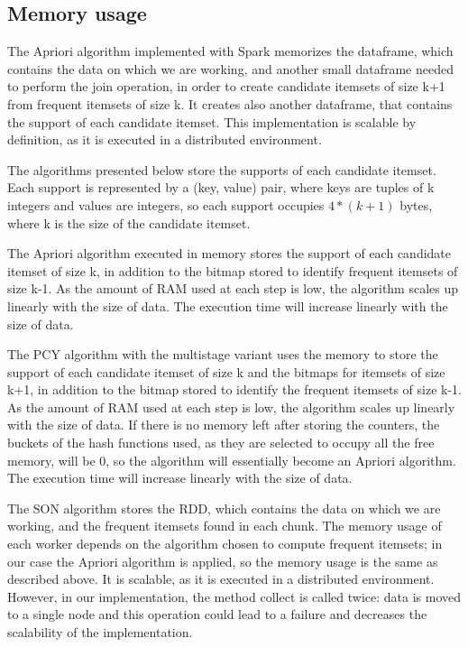 \documentclass[conference,compsoc]{IEEEtran}
\theoremstyle{definition}
\begin{document}
\subsection{Memory usage}

The Apriori algorithm implemented with Spark memorizes the dataframe, which contains the data on which we are working, and another small dataframe needed to perform the join operation, in order to create candidate itemsets of size k+1 from frequent itemsets of size k. It creates also another dataframe, that contains the support of each candidate itemset. This implementation is scalable by definition, as it is executed in a distributed environment.

The algorithms presented below store the supports of each candidate itemset. Each support is represented by a (key, value) pair, where keys are tuples of k integers and values are integers, so each support occupies \(4*(k+1)\) bytes, where k is the size of the candidate itemset.

The Apriori algorithm executed in memory stores the support of each candidate itemset of size k, in addition to the bitmap stored to identify frequent itemsets of size k-1. As the amount of RAM used at each step is low, the algorithm scales up linearly with the size of data. The execution time will increase linearly with the size of data. 

The PCY algorithm with the multistage variant uses the memory to store the support of each candidate itemset of size k and the bitmaps for itemsets of size k+1, in addition to the bitmap stored to identify the frequent itemsets of size k-1. As the amount of RAM used at each step is low, the algorithm scales up linearly with the size of data. If there is no memory left after storing the counters, the buckets of the hash functions used, as they are selected to occupy all the free memory, will be 0, so the algorithm will essentially become an Apriori algorithm. The execution time will increase linearly with the size of data. 

The SON algorithm stores the RDD, which contains the data on which we are working, and the frequent itemsets found in each chunk. The memory usage of each worker depends on the algorithm chosen to compute frequent itemsets; in our case the Apriori algorithm is applied, so the memory usage is the same as described above. It is scalable, as it is executed in a distributed environment. However, in our implementation, the method collect is called twice: data is moved to a single node and this operation could lead to a failure and decreases the scalability of the implementation.
\end{document}

